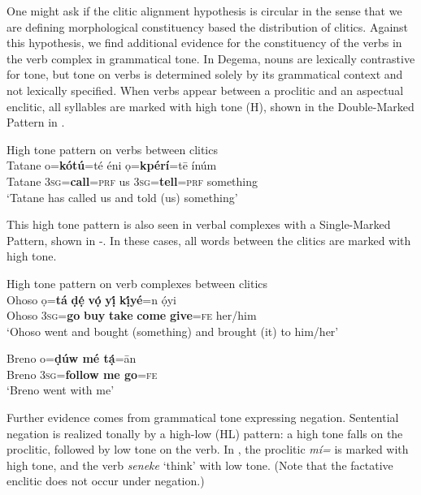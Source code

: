\documentclass[output=paper]{langsci/langscibook}
\begin{document}
One might ask if the clitic alignment hypothesis is circular in the sense that we are defining morphological constituency based the distribution of clitics. Against this hypothesis, we find additional evidence for the constituency of the verbs in the verb complex in grammatical tone. In Degema, nouns are lexically contrastive for tone, but tone on verbs is determined solely by its grammatical context and not lexically specified. When verbs appear between a proclitic and an aspectual enclitic, all syllables are marked with high tone (H), shown in the Double-Marked Pattern in .

\ea\label{ex:rolle:49}
{High tone pattern on verbs between clitics}\\
\gll  Tatane  o=\textbf{kótú}=té     éni   ọ=\textbf{kpérí}=tē     ínúm\\
     Tatane  3\textsc{sg}=\textbf{call}=\textsc{prf}   us   3\textsc{sg}=\textbf{tell}=\textsc{prf}  something\\
\glt ‘Tatane has called us and told (us) something’ \citep[285]{Kari2003a} 
\z

This high tone pattern is also seen in verbal complexes with a Single-Marked Pattern, shown in -. In these cases, all words between the clitics are marked with high tone. 


\ea\label{ex:rolle:ht}
{High tone pattern on verb complexes between clitics} \\
\ea\label{ex:rolle:50}
\gll   Ohoso   ọ=\textbf{tá}  \textbf{ḍẹ́ } \textbf{vọ́  } \textbf{ y\'ị } \textbf{k\'ịyé}=n   \'ọyi\\
     Ohoso    \textsc{3sg}=\textbf{go}  \textbf{buy}  \textbf{take}  \textbf{come}  \textbf{give}=\textsc{fe}   her/him\\
\glt ‘Ohoso went and bought (something) and brought (it) to him/her’ \citep[121]{Kari2004}

\ex\label{ex:rolle:51}
\gll   Breno   o=\textbf{ḍúw    mé   tạ́}=ān\\
     Breno   3\textsc{sg}=\textbf{follow  me   go}=\textsc{fe}\\
\glt ‘Breno went with me’ \citep[115]{Kari2004}
\z
\z 

Further evidence comes from grammatical tone expressing negation. Sentential negation is realized tonally by a high-low (HL) pattern: a high tone falls on the proclitic, followed by low tone on the verb. In , the proclitic \textit{mí=} is marked with high tone, and the verb \textit{seneke} ‘think’ with low tone. (Note that the factative enclitic does not occur under negation.)
\end{document}

